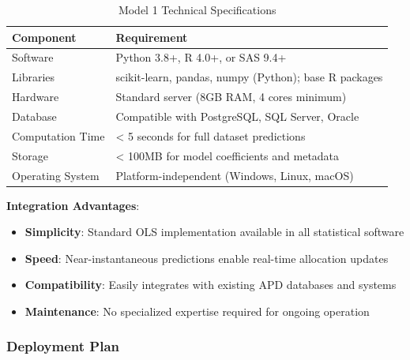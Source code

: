 \begin{table}[h]
\centering
\caption{Model 1 Technical Specifications}
\begin{tabular}{ll}
\toprule
\textbf{Component} & \textbf{Requirement} \\
\midrule
Software & Python 3.8+, R 4.0+, or SAS 9.4+ \\
Libraries & scikit-learn, pandas, numpy (Python); base R packages \\
Hardware & Standard server (8GB RAM, 4 cores minimum) \\
Database & Compatible with PostgreSQL, SQL Server, Oracle \\
Computation Time & < 5 seconds for full dataset predictions \\
Storage & < 100MB for model coefficients and metadata \\
Operating System & Platform-independent (Windows, Linux, macOS) \\
\bottomrule
\end{tabular}
\end{table}

\textbf{Integration Advantages}:
\begin{itemize}
    \item \textbf{Simplicity}: Standard OLS implementation available in all statistical software
    \item \textbf{Speed}: Near-instantaneous predictions enable real-time allocation updates
    \item \textbf{Compatibility}: Easily integrates with existing APD databases and systems
    \item \textbf{Maintenance}: No specialized expertise required for ongoing operation
\end{itemize}

\subsubsection{Deployment Plan}

